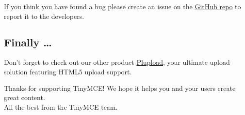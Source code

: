 \documentclass[]{article}
\begin{document}
If you think you have found a bug please create an issue on the
\href{https://github.com/tinymce/tinymce/issues}{GitHub repo} to report
it to the developers.

\subsection{Finally \ldots{}}\label{finally}

Don't forget to check out our other product
\href{http://www.plupload.com}{Plupload}, your ultimate upload solution
featuring HTML5 upload support.

Thanks for supporting TinyMCE! We hope it helps you and your users
create great content.\\
All the best from the TinyMCE team.
\end{document}

